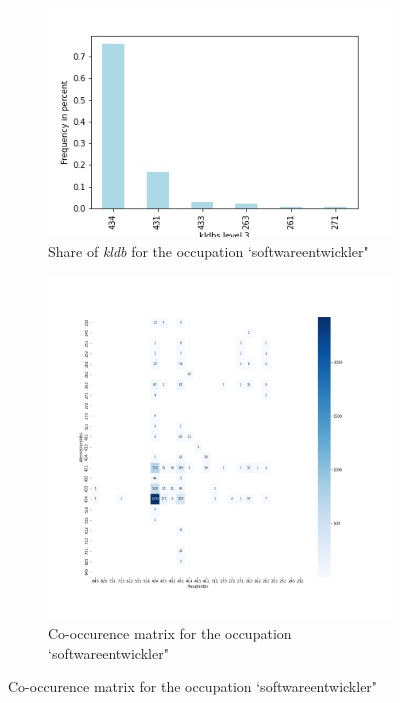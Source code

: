 \documentclass[12pt, a4paper, titlepage]{article}
\begin{document}
\begin{figure}
  \begin{subfigure}{.5\textwidth}
    \centering
    \includegraphics[width=.8\linewidth]{kldbs_frequency_softwareentwickler.jpg}
    \caption{\label{fig: F27} Share of \textit{kldb} for the occupation `softwareentwickler"}
  \end{subfigure}%
  \begin{subfigure}{.5\textwidth}
    \centering
    \includegraphics[width=.9\linewidth]{co_occurence_softwareentwickler.jpg}
    \caption{\label{fig: F28} Co-occurence matrix for the occupation `softwareentwickler"}
  \end{subfigure}
  \end{figure}
\end{document}
